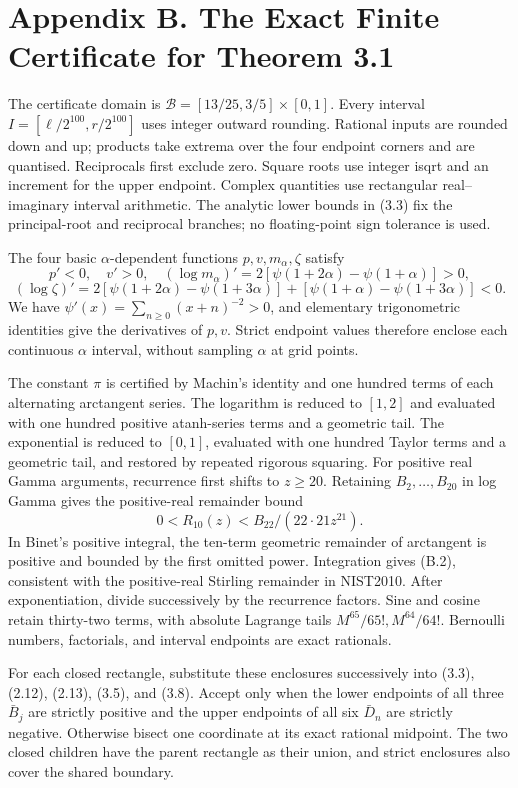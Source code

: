 \documentclass[a4paper,11pt]{article}
\begin{document}
\section*{Appendix B. The Exact Finite Certificate for Theorem 3.1}

The certificate domain is \(\mathcal B=[13/25,3/5]\times[0,1]\). Every interval \(I=[\ell/2^{100},r/2^{100}]\) uses integer outward rounding. Rational inputs are rounded down and up; products take extrema over the four endpoint corners and are quantised. Reciprocals first exclude zero. Square roots use integer isqrt and an increment for the upper endpoint. Complex quantities use rectangular real–imaginary interval arithmetic. The analytic lower bounds in (3.3) fix the principal-root and reciprocal branches; no floating-point sign tolerance is used.

The four basic \(\alpha\)-dependent functions \(p,v,m_\alpha,\zeta\) satisfy
\[
p'<0,\quad v'>0,\quad
(\log m_\alpha)'=2[\psi(1+2\alpha)-\psi(1+\alpha)]>0,
\]
\[
(\log\zeta)'=2[\psi(1+2\alpha)-\psi(1+3\alpha)]
 +[\psi(1+\alpha)-\psi(1+3\alpha)]<0.
\tag{B.1}
\]
We have \(\psi'(x)=\sum_{n\ge0}(x+n)^{-2}>0\), and elementary trigonometric identities give the derivatives of \(p,v\). Strict endpoint values therefore enclose each continuous \(\alpha\) interval, without sampling \(\alpha\) at grid points.

The constant \(\pi\) is certified by Machin's identity and one hundred terms of each alternating arctangent series. The logarithm is reduced to \([1,2]\) and evaluated with one hundred positive atanh-series terms and a geometric tail. The exponential is reduced to \([0,1]\), evaluated with one hundred Taylor terms and a geometric tail, and restored by repeated rigorous squaring. For positive real Gamma arguments, recurrence first shifts to \(z\ge20\). Retaining \(B_2,\ldots,B_{20}\) in log Gamma gives the positive-real remainder bound
\[
0<R_{10}(z)<B_{22}/(22\cdot21z^{21}).
\tag{B.2}
\]
In Binet's positive integral, the ten-term geometric remainder of arctangent is positive and bounded by the first omitted power. Integration gives (B.2), consistent with the positive-real Stirling remainder in NIST2010. After exponentiation, divide successively by the recurrence factors. Sine and cosine retain thirty-two terms, with absolute Lagrange tails \(M^{65}/65!,M^{64}/64!\). Bernoulli numbers, factorials, and interval endpoints are exact rationals.

For each closed rectangle, substitute these enclosures successively into (3.3), (2.12), (2.13), (3.5), and (3.8). Accept only when the lower endpoints of all three \(\bar B_j\) are strictly positive and the upper endpoints of all six \(\bar D_n\) are strictly negative. Otherwise bisect one coordinate at its exact rational midpoint. The two closed children have the parent rectangle as their union, and strict enclosures also cover the shared boundary.
\end{document}
